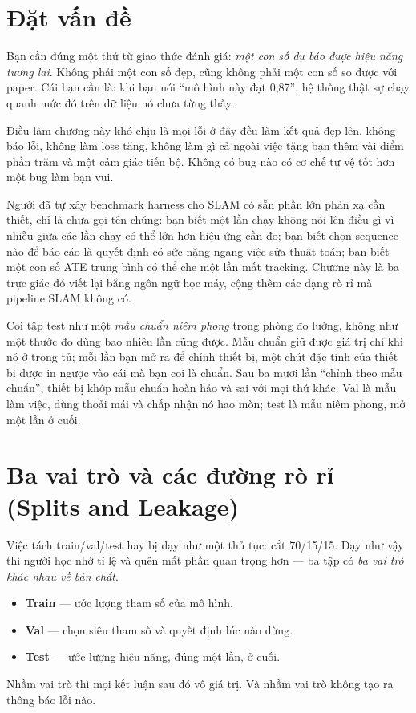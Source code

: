 \documentclass[../../deep_learning.tex]{subfiles}
\begin{document}
\section{Đặt vấn đề}
Bạn cần đúng một thứ từ giao thức đánh giá: \emph{một con số dự báo được hiệu năng tương lai}. Không phải một con số đẹp, cũng không phải một con số so được với paper. Cái bạn cần là: khi bạn nói ``mô hình này đạt 0{,}87'', hệ thống thật sự chạy quanh mức đó trên dữ liệu nó chưa từng thấy.

Điều làm chương này khó chịu là mọi lỗi ở đây đều làm kết quả đẹp lên.  không báo lỗi, không làm loss tăng, không làm gì cả ngoài việc tặng bạn thêm vài điểm phần trăm và một cảm giác tiến bộ. Không có bug nào có cơ chế tự vệ tốt hơn một bug làm bạn vui.

Người đã tự xây benchmark harness cho SLAM có sẵn phần lớn phản xạ cần thiết, chỉ là chưa gọi tên chúng: bạn biết một lần chạy không nói lên điều gì vì nhiễu giữa các lần chạy có thể lớn hơn hiệu ứng cần đo; bạn biết chọn sequence nào để báo cáo là quyết định có sức nặng ngang việc sửa thuật toán; bạn biết một con số ATE trung bình có thể che một lần mất tracking. Chương này là ba trực giác đó viết lại bằng ngôn ngữ học máy, cộng thêm các dạng rò rỉ mà pipeline SLAM không có.

\begin{trucgiac}
Coi tập test như một \emph{mẫu chuẩn niêm phong} trong phòng đo lường, không như một thước đo dùng bao nhiêu lần cũng được. Mẫu chuẩn giữ được giá trị chỉ khi nó ở trong tủ; mỗi lần bạn mở ra để chỉnh thiết bị, một chút đặc tính của thiết bị được in ngược vào cái mà bạn coi là chuẩn. Sau ba mươi lần ``chỉnh theo mẫu chuẩn'', thiết bị khớp mẫu chuẩn hoàn hảo và sai với mọi thứ khác. Val là mẫu làm việc, dùng thoải mái và chấp nhận nó hao mòn; test là mẫu niêm phong, mở một lần ở cuối.
\end{trucgiac}

\section{Ba vai trò và các đường rò rỉ (Splits and Leakage)}
Việc tách train/val/test hay bị dạy như một thủ tục: cắt 70/15/15. Dạy như vậy thì người học nhớ tỉ lệ và quên mất phần quan trọng hơn --- ba tập có \emph{ba vai trò khác nhau về bản chất}.
\begin{itemize}
\item \textbf{Train} --- ước lượng tham số của mô hình.
\item \textbf{Val} --- chọn siêu tham số và quyết định lúc nào dừng.
\item \textbf{Test} --- ước lượng hiệu năng, đúng một lần, ở cuối.
\end{itemize}
Nhầm vai trò thì mọi kết luận sau đó vô giá trị. Và nhầm vai trò không tạo ra thông báo lỗi nào.
\end{document}
